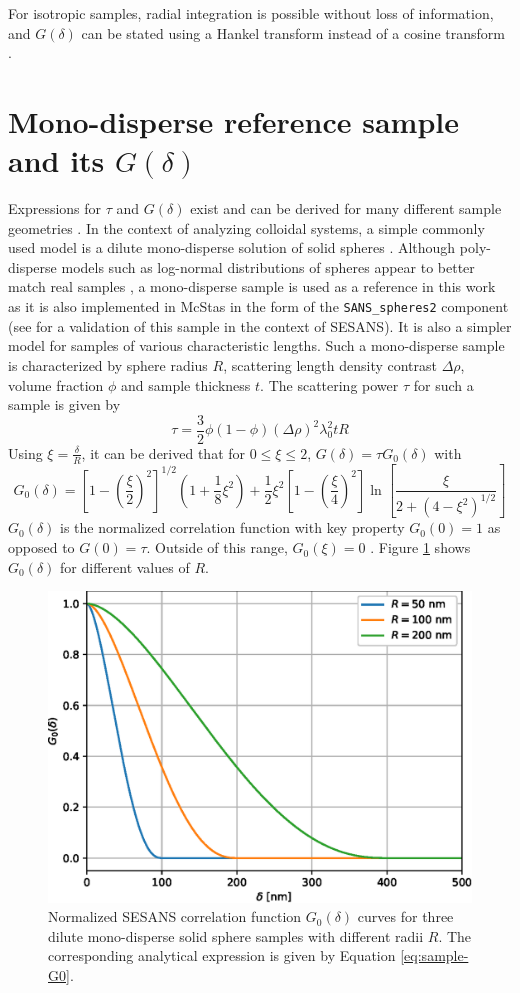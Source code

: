 For isotropic samples, radial integration is possible without loss of information, and $G(\delta)$ can be stated using a Hankel transform instead of a cosine transform \cite{andersson2008}.

\section{Mono-disperse reference sample and its $G(\delta)$}
\label{c2.4}
Expressions for $\tau$ and $G(\delta)$ exist and can be derived for many different sample geometries \cite{andersson2008}. In the context of analyzing colloidal systems, a simple commonly used model is a dilute mono-disperse solution of solid spheres \cite{tromp2007}. Although poly-disperse models such as log-normal distributions of spheres appear to better match real samples \cite{heijkamp2011}, a mono-disperse sample is used as a reference in this work as it is also implemented in McStas in the form of the \texttt{SANS\_spheres2} component (see \cite{parnell2024} for a validation of this sample in the context of SESANS). It is also a simpler model for samples of various characteristic lengths. Such a mono-disperse sample is characterized by sphere radius $R$, scattering length density contrast $\Delta\rho$, volume fraction $\phi$ and sample thickness $t$. The scattering power $\tau$ for such a sample is given by
\begin{equation}
	\tau = \frac{3}{2}\phi (1 - \phi) (\Delta\rho)^2\lambda_0^2tR \label{eq:sample-tau}
\end{equation}
Using $\xi = \frac{\delta}{R}$, it can be derived that for $0\leq \xi \leq 2$, $G(\delta) = \tau G_0(\delta)$ with 
\begin{equation}
	G_0(\delta) = \left[1 - \left(\frac{\xi}{2}\right)^2\right]^{1/2}\left(1 + \frac{1}{8}\xi^2\right) + \frac{1}{2}\xi^2\left[1 - \left(\frac{\xi}{4}\right)^2\right]\ln \left[\frac{\xi}{2 + (4 - \xi^2)^{1/2}}\right] \label{eq:sample-G0}
\end{equation}
$G_0(\delta)$ is the normalized correlation function with key property $G_0(0) = 1$ as opposed to $G(0) = \tau$. Outside of this range, $G_0(\xi) = 0$ \cite{krouglov2003}. Figure \ref{fig:analytical-G0} shows $G_0(\delta)$ for different values of $R$. 

\begin{figure}
	\centering
	\includegraphics[width=0.5\linewidth]{analytical-G0}
	\caption{Normalized SESANS correlation function $G_0(\delta)$ curves for three dilute mono-disperse solid sphere samples with different radii $R$. The corresponding analytical expression is given by Equation \eqref{eq:sample-G0}.}
	\label{fig:analytical-G0}
\end{figure}

